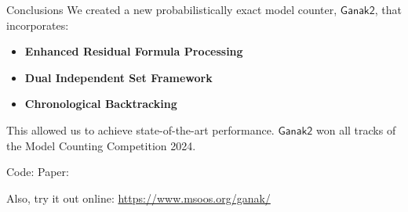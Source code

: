 \documentclass[aspectratio=169]{beamer}
\newcommand{\toolname}{\ensuremath{\mathsf{Ganak2}}}
\begin{document}
\begin{frame}{Conclusions}
We created a new probabilistically exact model counter, \toolname{}, that incorporates:
\begin{itemize}
  \item \textbf{Enhanced Residual Formula Processing}
  \item \textbf{Dual Independent Set Framework}
  \item \textbf{Chronological Backtracking}
\end{itemize}

This allowed us to achieve state-of-the-art performance. \toolname{} won 
all tracks of the Model Counting Competition 2024.
\bigskip

\begin{center}
Code: 
\qquad \qquad
Paper: 
\bigskip

Also, try it out online: \url{https://www.msoos.org/ganak/}
\end{center}
\end{frame}
\end{document}
